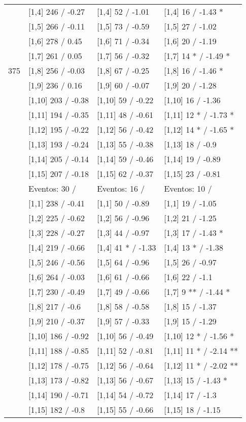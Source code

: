 \begin{table}
\begin{tabular}[t]{llll}
\addlinespace
 & {}[1,4] 246  / -0.27 & {}[1,4] 52  / -1.01 & {}[1,4] 16  / -1.43 *\\
 & {}[1,5] 266  / -0.11 & {}[1,5] 73  / -0.59 & {}[1,5] 27  / -1.02\\
 & {}[1,6] 278  / 0.45 & {}[1,6] 71  / -0.34 & {}[1,6] 20  / -1.19\\
 & {}[1,7] 261  / 0.05 & {}[1,7] 56  / -0.32 & {}[1,7] 14 * / -1.49 *\\
375 & {}[1,8] 256  / -0.03 & {}[1,8] 67  / -0.25 & {}[1,8] 16  / -1.46 *\\
\addlinespace
 & {}[1,9] 236  / 0.16 & {}[1,9] 60  / -0.07 & {}[1,9] 20  / -1.28\\
 & {}[1,10] 203  / -0.38 & {}[1,10] 59  / -0.22 & {}[1,10] 16  / -1.36\\
 & {}[1,11] 194  / -0.35 & {}[1,11] 48  / -0.61 & {}[1,11] 12 * / -1.73 *\\
 & {}[1,12] 195  / -0.22 & {}[1,12] 56  / -0.42 & {}[1,12] 14 * / -1.65 *\\
 & {}[1,13] 193  / -0.24 & {}[1,13] 55  / -0.38 & {}[1,13] 18  / -0.9\\
\addlinespace
 & {}[1,14] 205  / -0.14 & {}[1,14] 59  / -0.46 & {}[1,14] 19  / -0.89\\
 & {}[1,15] 207  / -0.18 & {}[1,15] 62  / -0.37 & {}[1,15] 23  / -0.81\\
 & Eventos:  30 / & Eventos:  16 / & Eventos:  10 /\\
 & {}[1,1] 238  / -0.41 & {}[1,1] 50  / -0.89 & {}[1,1] 19  / -1.05\\
 & {}[1,2] 225  / -0.62 & {}[1,2] 56  / -0.96 & {}[1,2] 21  / -1.25\\
\addlinespace
 & {}[1,3] 228  / -0.27 & {}[1,3] 44  / -0.97 & {}[1,3] 17  / -1.43 *\\
 & {}[1,4] 219  / -0.66 & {}[1,4] 41 * / -1.33 & {}[1,4] 13 * / -1.38\\
 & {}[1,5] 246  / -0.56 & {}[1,5] 64  / -0.96 & {}[1,5] 26  / -0.97\\
 & {}[1,6] 264  / -0.03 & {}[1,6] 61  / -0.66 & {}[1,6] 22  / -1.1\\
 & {}[1,7] 230  / -0.49 & {}[1,7] 49  / -0.66 & {}[1,7] 9 ** / -1.44 *\\
\addlinespace
500 & {}[1,8] 217  / -0.6 & {}[1,8] 58  / -0.58 & {}[1,8] 15  / -1.37\\
 & {}[1,9] 210  / -0.37 & {}[1,9] 57  / -0.33 & {}[1,9] 15  / -1.29\\
 & {}[1,10] 186  / -0.92 & {}[1,10] 56  / -0.49 & {}[1,10] 12 * / -1.56 *\\
 & {}[1,11] 188  / -0.85 & {}[1,11] 52  / -0.81 & {}[1,11] 11 * / -2.14 **\\
 & {}[1,12] 178  / -0.75 & {}[1,12] 56  / -0.64 & {}[1,12] 11 * / -2.02 **\\
\addlinespace
 & {}[1,13] 173  / -0.82 & {}[1,13] 56  / -0.67 & {}[1,13] 15  / -1.43 *\\
 & {}[1,14] 190  / -0.71 & {}[1,14] 54  / -0.72 & {}[1,14] 17  / -1.3\\
 & {}[1,15] 182  / -0.8 & {}[1,15] 55  / -0.66 & {}[1,15] 18  / -1.15\\
\bottomrule
\end{tabular}
\end{table}
